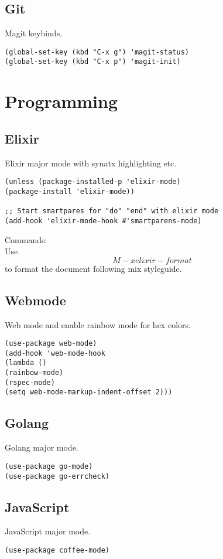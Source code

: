 \documentclass[11pt]{article}
\begin{document}
\subsection*{Git}
\label{sec:orgac1ef4e}
Magit keybinds.
\begin{verbatim}
(global-set-key (kbd "C-x g") 'magit-status)
(global-set-key (kbd "C-x p") 'magit-init)
\end{verbatim}
\section*{Programming}
\label{sec:org9fc3ccc}
\subsection*{Elixir}
\label{sec:orge3c2cfd}
Elixir major mode with synatx highlighting etc.
\begin{verbatim}
(unless (package-installed-p 'elixir-mode)
(package-install 'elixir-mode))

;; Start smartpares for "do" "end" with elixir mode
(add-hook 'elixir-mode-hook #'smartparens-mode)
\end{verbatim}

Commands:\\
Use
\[M-x elixir-format\]
to format the document following mix styleguide.
\subsection*{Webmode}
\label{sec:org97c63fd}
Web mode and enable rainbow mode for hex colors.
\begin{verbatim}
(use-package web-mode)
(add-hook 'web-mode-hook
(lambda ()
(rainbow-mode)
(rspec-mode)
(setq web-mode-markup-indent-offset 2)))
\end{verbatim}
\subsection*{Golang}
\label{sec:org0b3c402}
Golang major mode.
\begin{verbatim}
(use-package go-mode)
(use-package go-errcheck)
\end{verbatim}
\subsection*{JavaScript}
\label{sec:orge5a6ec5}
JavaScript major mode.
\begin{verbatim}
(use-package coffee-mode)
\end{verbatim}
\end{document}
